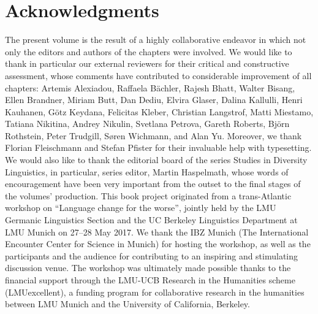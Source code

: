 \documentclass[output=paper,hidelinks]{langscibook}
\begin{document}
\section*{Acknowledgments}


The present volume is the result of a highly collaborative endeavor in which not only the editors and authors of the chapters were involved. We would like to thank in particular our external reviewers for their critical and constructive assessment, whose comments have contributed to considerable improvement of all chapters: Artemis Alexiadou, Raffaela Bächler, Rajesh Bhatt, Walter Bisang, Ellen Brandner, Miriam Butt, Dan Dediu, Elvira Glaser, Dalina Kallulli, Henri Kauhanen, Götz Keydana, Felicitas Kleber, Christian Langstrof, Matti Miestamo, Tatiana Nikitina, Andrey Nikulin, Svetlana Petrova, Gareth Roberts, Björn Rothstein, Peter Trudgill, Søren Wichmann, and Alan Yu. Moreover, we thank Florian Fleischmann and Stefan Pfister for their invaluable help with typesetting. We would also like to thank the editorial board of the series Studies in Diversity Linguistics, in particular, series editor, Martin Haspelmath, whose words of encouragement have been very important from the outset to the final stages of the volumes’ production. This book project originated from a trans-Atlantic workshop on ``Language change for the worse'', jointly held by the LMU Germanic Linguistics Section and the UC Berkeley Linguistics Department at LMU Munich on 27--28 May 2017. We thank the IBZ Munich (The International Encounter Center for Science in Munich) for hosting the workshop, as well as the participants and the audience for contributing to an inspiring and stimulating discussion venue. The workshop was ultimately made possible thanks to the financial support through the LMU-UCB Research in the Humanities scheme (LMUexcellent), a funding program for collaborative research in the humanities between LMU Munich and the University of California, Berkeley.

{\sloppy\printbibliography[heading=subbibliography,notkeyword=this]}
\end{document}
